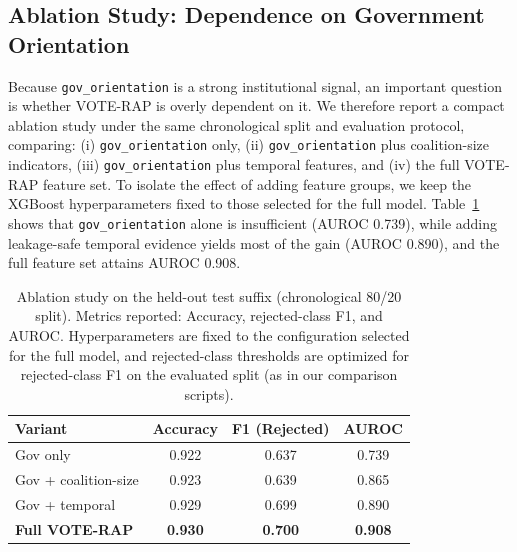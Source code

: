 \documentclass[review]{elsarticle}
\begin{document}
\subsection{Ablation Study: Dependence on Government Orientation}
\label{sec:ablation}
Because \texttt{gov\_\allowbreak orientation} is a strong institutional signal, an important question is whether VOTE-RAP is overly dependent on it. We therefore report a compact ablation study under the same chronological split and evaluation protocol, comparing: (i) \texttt{gov\_\allowbreak orientation} only, (ii) \texttt{gov\_\allowbreak orientation} plus coalition-size indicators, (iii) \texttt{gov\_\allowbreak orientation} plus temporal features, and (iv) the full VOTE-RAP feature set. To isolate the effect of adding feature groups, we keep the XGBoost hyperparameters fixed to those selected for the full model. Table~\ref{tab:ablation} shows that \texttt{gov\_\allowbreak orientation} alone is insufficient (AUROC 0.739), while adding leakage-safe temporal evidence yields most of the gain (AUROC 0.890), and the full feature set attains AUROC 0.908.

\begin{table}[H]
\caption{Ablation study on the held-out test suffix (chronological 80/20 split). Metrics reported: Accuracy, rejected-class F1, and AUROC. Hyperparameters are fixed to the configuration selected for the full model, and rejected-class thresholds are optimized for rejected-class F1 on the evaluated split (as in our comparison scripts).}
\centering
\small
\setlength{\tabcolsep}{6pt}
\renewcommand{\arraystretch}{1.15}
\begin{tabular}{|l|c|c|c|}
\hline
\textbf{Variant} & \textbf{Accuracy} & \textbf{F1 (Rejected)} & \textbf{AUROC} \\ \hline
Gov only & 0.922 & 0.637 & 0.739 \\ \hline
Gov + coalition-size & 0.923 & 0.639 & 0.865 \\ \hline
Gov + temporal & 0.929 & 0.699 & 0.890 \\ \hline
\textbf{Full VOTE-RAP} & \textbf{0.930} & \textbf{0.700} & \textbf{0.908} \\ \hline
\end{tabular}
\label{tab:ablation}
\normalsize
\end{table}
\end{document}
